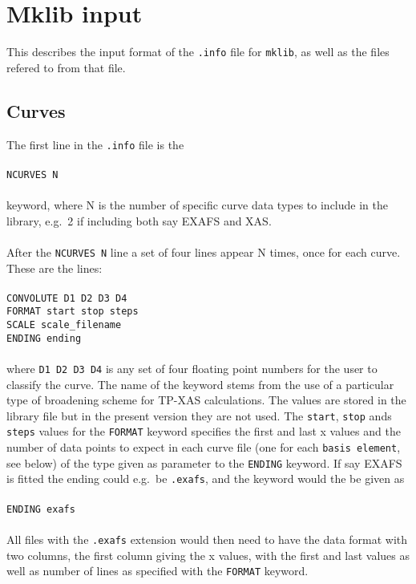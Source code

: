 \documentclass[a4paper, 10pt]{article}
\begin{document}
\section{Mklib input}
\label{mklib-input}
This describes the input format of the {\tt .info} file for {\tt mklib},
as well as the files refered to from that file.

\subsection{Curves}
The first line in the {\tt .info} file is the\\\\
{\tt NCURVES N}\\\\
keyword, where N is the number of specific curve data types to include
in the library, e.g.\ 2 if including both say EXAFS and XAS.\\\\
After the {\tt NCURVES N} line a set of four lines appear N times,
once for each curve. These are the lines:\\\\
{\tt CONVOLUTE D1 D2 D3 D4}\\
{\tt FORMAT start stop steps}\\
{\tt SCALE scale\_filename}\\
{\tt ENDING ending}\\\\
where {\tt D1 D2 D3 D4} is any set of four floating point numbers for
the user to classify the curve. The name of the keyword stems from the
use of a particular type of broadening scheme for TP-XAS
calculations. The values are stored in the library file but in the
present version they are not used. The {\tt start}, {\tt stop}
ands {\tt steps} values for the {\tt FORMAT} keyword specifies the
first and last x values and the number of data points to expect in
each curve file (one for each {\tt basis element}, see below) of the type given as
parameter to the {\tt ENDING} keyword. If say EXAFS is fitted the
ending could e.g.\ be {\tt .exafs}, and the keyword would the be given as\\\\
{\tt ENDING exafs}\\\\
All files with the {\tt .exafs} extension would then need to have the
data format with two columns, the first column giving the x values,
with the first and last values as well as number of lines as specified
with the {\tt FORMAT} keyword.
\end{document}
